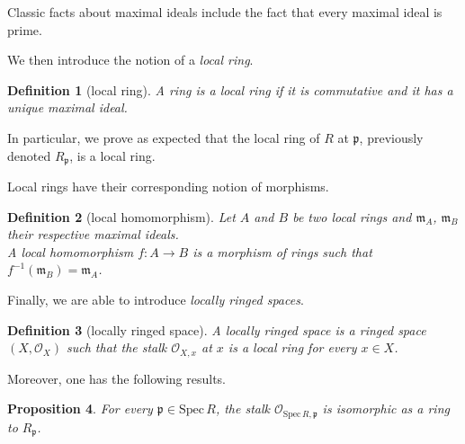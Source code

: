\documentclass[12pt]{scrartcl}
\newtheorem{proposition}{Proposition}[section]
\newtheorem{definition}[proposition]{Definition}
\def\spec{\text{Spec}\,R}
\begin{document}
Classic facts about maximal ideals include the fact that every maximal ideal is prime.

	
We then introduce the notion of a \emph{local ring}.

\begin{definition}[local ring]
	A ring is a local ring if it is commutative and it has a unique maximal ideal. 	
\end{definition}


In particular, we prove as expected that the local ring of $R$ at $\mathfrak{p}$, previously denoted $R_{\mathfrak{p}}$, is a local ring.


Local rings have their corresponding notion of morphisms. 

\begin{definition}[local homomorphism]
	Let $A$ and $B$ be two local rings and $\mathfrak{m}_A$, $\mathfrak{m}_B$ their respective maximal ideals. \\
	A local homomorphism $f: A \rightarrow B$ is a morphism of rings such that $f^{-1} (\mathfrak{m}_B) = \mathfrak{m}_A$. 
\end{definition}


Finally, we are able to introduce \emph{locally ringed spaces}.

\begin{definition}[locally ringed space]
	A locally ringed space is a ringed space $(X, \mathscr{O}_X)$ such that the stalk $\mathscr{O}_{X, x}$ at $x$ is a local ring for every $x \in X$.
\end{definition}


Moreover, one has the following results.

\begin{proposition}
	For every $\mathfrak{p} \in \text{Spec}\,R$, the stalk $\mathscr{O}_{\spec, \mathfrak{p}}$ is isomorphic as a ring to $R_{\mathfrak{p}}$.	
\end{proposition}	
\end{document}

